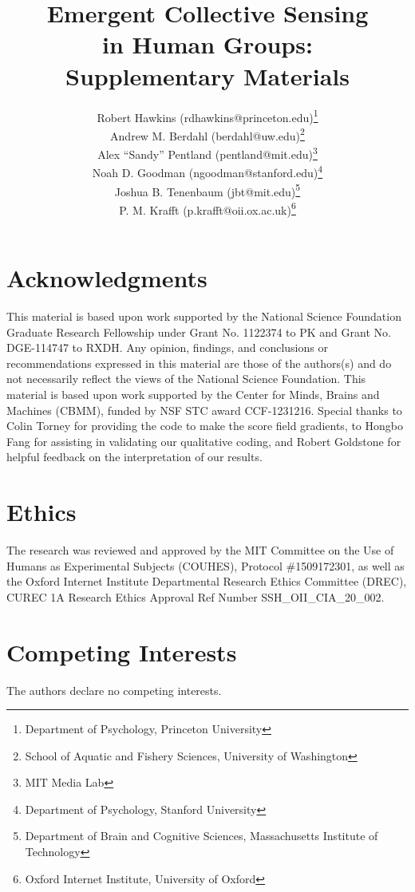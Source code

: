 \documentclass[12pt,letterpaper]{article}
\title{Emergent Collective Sensing\\ in Human Groups:\\Supplementary Materials}
\author{
Robert Hawkins (rdhawkins@princeton.edu)\thanks{Department of Psychology, Princeton University}\\
Andrew M. Berdahl (berdahl@uw.edu)\thanks{School of Aquatic and Fishery Sciences, University of Washington}\\
Alex ``Sandy'' Pentland (pentland@mit.edu)\thanks{MIT Media Lab}\\
Noah D. Goodman (ngoodman@stanford.edu)\thanks{Department of Psychology, Stanford University}\\
Joshua B. Tenenbaum (jbt@mit.edu)\thanks{Department of Brain and Cognitive Sciences, Massachusetts Institute of Technology}\\
P. M. Krafft (p.krafft@oii.ox.ac.uk)\thanks{Oxford Internet Institute, University of Oxford}
}
\date{}
\begin{document}
\maketitle
\vspace{-2em}

\renewcommand{\thesection}{S\arabic{section}}
\renewcommand{\thefigure}{S\arabic{figure}}
\renewcommand{\thetable}{S\arabic{table}}

\setcounter{section}{0}
\setcounter{figure}{0}
\setcounter{table}{0}


\section*{Acknowledgments}

\small

This material is based upon work supported by the National Science
Foundation Graduate Research Fellowship under Grant No. 1122374 to PK
and Grant No. DGE-114747 to RXDH. Any opinion, findings, and
conclusions or recommendations expressed in this material are those of
the authors(s) and do not necessarily reflect the views of the
National Science Foundation.  This material is based upon work
supported by the Center for Minds, Brains and Machines (CBMM), funded
by NSF STC award CCF-1231216.
Special thanks to Colin Torney for providing the code to make the score field gradients, to Hongbo Fang for assisting in validating our qualitative coding, and Robert Goldstone for helpful feedback on the interpretation of our results.


\section*{Ethics}

\small

The research was reviewed and approved by the MIT Committee on the Use of Humans as Experimental Subjects (COUHES), Protocol \#1509172301, as well as the Oxford Internet Institute Departmental Research Ethics Committee (DREC), CUREC 1A Research Ethics Approval Ref Number SSH\_OII\_CIA\_20\_002.



\section*{Competing Interests}

\small

The authors declare no competing interests.
\end{document}

